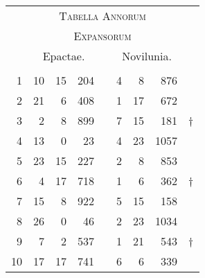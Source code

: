%
\begin{tabnums} %
\footnotesize
\centering
\setlength{\tabcolsep}{1.0ex}
%
\newcommand{\cwd}{3.2em}
\newcommand{\da}{{\tiny †}}
\newcommand{\db}{{\scriptsize o}}
\newcommand{\ang}{90}
\newcommand{\hsb}[1]{\small{#1}}
\newcommand{\hsa}[1]{\tiny{#1}}
%
\newcommand{\hdrB}{%
  ~ &
  \multicolumn{3}{c}{\hsb{Epactae.}} &
  &
  \multicolumn{3}{c}{\hsb{Novilunia.}}  
}
%
\newcommand{\hdrA}{%
  \ch{888}{\hsa{Anni expansi}} &
  \ch{1888}{\hsa{Epact.}}&
  \ch{888}{\hsa{Hor.}} &
  \ch{1888}{\hsa{Scrup.}} &
  &
  \ch{1888}{\hsa{Feria.}} &
  \ch{888}{\hsa{Hor.}} &
  \ch{1888}{\hsa{Scrup.}}
}
%
\newcommand{\hdrs}{%
\hdrB \\
\cmidrule(lr){2-4} \cmidrule(lr){6-8}
\hdrA \\
}
%
\begin{tabular}[c]{@{} r rrr c rrr l@{}}
\toprule
\multicolumn{9}{c}{\Large\textsc{Tabella Annorum}} \\
\multicolumn{9}{c}{\large\textsc{Expansorum}} \\
\toprule
\hdrs %
\midrule
 1 & 10 & 15 &  204 && 4 &  8 &  876 & ~\\
 2 & 21 &  6 &  408 && 1 & 17 &  672 & ~\\
 3 &  2 &  8 &  899 && 7 & 15 &  181 & \da \\
 4 & 13 &  0 &   23 && 4 & 23 & 1057 & ~\\
 5 & 23 & 15 &  227 && 2 &  8 &  853 & ~\\
 6 &  4 & 17 &  718 && 1 &  6 &  362 & \da \\
 7 & 15 &  8 &  922 && 5 & 15 &  158 & ~\\
 8 & 26 &  0 &   46 && 2 & 23 & 1034 & ~\\
 9 &  7 &  2 &  537 && 1 & 21 &  543 & \da \\
10 & 17 & 17 &  741 && 6 &  6 &  339 & ~\\

\end{tabular}
\end{tabnums}
